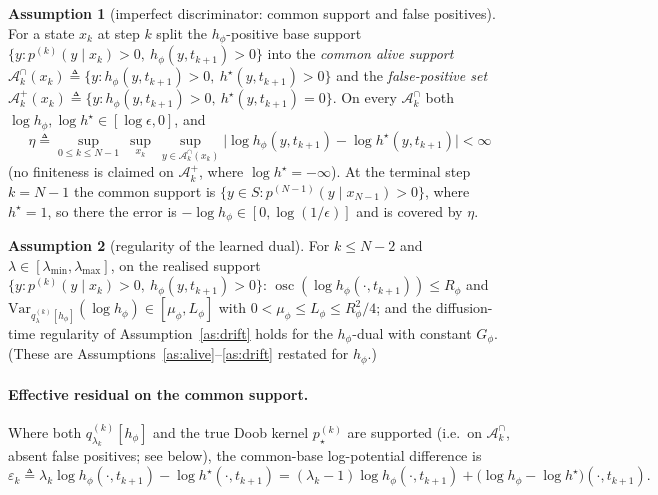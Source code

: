 \documentclass[11pt]{article}
\newcommand{\Var}{\mathrm{Var}}
\newcommand{\Aset}{\mathcal{A}}
\newcommand{\hs}{h^\star}
\DeclareMathOperator*{\osc}{osc}
\newcommand{\lmin}{\lambda_{\min}}
\newcommand{\lmax}{\lambda_{\max}}
\theoremstyle{plain}
\theoremstyle{definition}
\newtheorem{assumption}{Assumption}
\theoremstyle{remark}
\begin{document}
\begin{assumption}[imperfect discriminator: common support and false positives]
\label{as:eta}
For a state $x_k$ at step $k$ split the $h_\phi$-positive base support
$\{y:p^{(k)}(y\mid x_k)>0,\ h_\phi(y,t_{k+1})>0\}$ into the \emph{common alive support}
$\Aset^\cap_k(x_k)\triangleq\{y:h_\phi(y,t_{k+1})>0,\ \hs(y,t_{k+1})>0\}$ and the
\emph{false-positive set} $\Aset^+_k(x_k)\triangleq\{y:h_\phi(y,t_{k+1})>0,\ \hs(y,t_{k+1})=0\}$.
On every $\Aset^\cap_k$ both $\log h_\phi,\log\hs\in[\log\epsilon,0]$, and
\[
\eta\triangleq\sup_{0\le k\le N-1}\ \sup_{x_k}\ \sup_{y\in\Aset^\cap_k(x_k)}
\big|\log h_\phi(y,t_{k+1})-\log\hs(y,t_{k+1})\big|<\infty
\]
(no finiteness is claimed on $\Aset^+_k$, where $\log\hs=-\infty$). At the terminal step $k=N-1$
the common support is $\{y\in S:p^{(N-1)}(y\mid x_{N-1})>0\}$, where $\hs=1$, so there the error is
$-\log h_\phi\in[0,\log(1/\epsilon)]$ and is covered by $\eta$.
\end{assumption}

\begin{assumption}[regularity of the learned dual]
\label{as:eta-reg}
For $k\le N-2$ and $\lambda\in[\lmin,\lmax]$, on the realised support
$\{y:p^{(k)}(y\mid x_k)>0,\ h_\phi(y,t_{k+1})>0\}$: $\osc(\log h_\phi(\cdot,t_{k+1}))\le R_\phi$ and
$\Var_{q^{(k)}_\lambda[h_\phi]}(\log h_\phi)\in[\mu_\phi,L_\phi]$ with $0<\mu_\phi\le L_\phi\le R_\phi^2/4$;
and the diffusion-time regularity of Assumption~\ref{as:drift} holds for the $h_\phi$-dual with
constant $G_\phi$. (These are Assumptions~\ref{as:alive}--\ref{as:drift} restated for $h_\phi$.)
\end{assumption}

\paragraph{Effective residual on the common support.} Where both $q^{(k)}_{\lambda_k}[h_\phi]$
and the true Doob kernel $p^{(k)}_\star$ are supported (i.e.\ on $\Aset^\cap_k$, absent false
positives; see below), the common-base log-potential difference is
\begin{equation}
\label{eq:eta-res}
\varepsilon_k\triangleq\lambda_k\log h_\phi(\cdot,t_{k+1})-\log\hs(\cdot,t_{k+1})
=(\lambda_k-1)\log h_\phi(\cdot,t_{k+1})+\big(\log h_\phi-\log\hs\big)(\cdot,t_{k+1}).
\end{equation}
\end{document}
